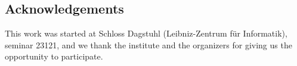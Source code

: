 \documentclass[a4paper]{article}
\begin{document}

\subsection*{Acknowledgements}
This work was started at Schloss Dagstuhl (Leibniz-Zentrum für
Informatik), seminar 23121, and we thank the institute and the
organizers for giving us the opportunity to participate.



\end{document}
